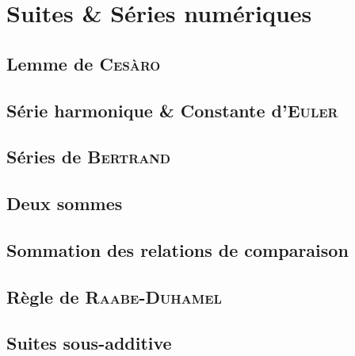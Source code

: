 \chapter{Suites \& Séries numériques}



\newpage

\section{Lemme de \textsc{Cesàro}} \label{lemme_cesaro}


\section{Série harmonique \& Constante d'\textsc{Euler}}


\section{Séries de \textsc{Bertrand}}


\section{Deux sommes} \label{deux_sommes}


\section{Sommation des relations de comparaison} \label{sommation_relations_comparaison}


\section{Règle de \textsc{Raabe-Duhamel}}


\section{Suites sous-additive}


